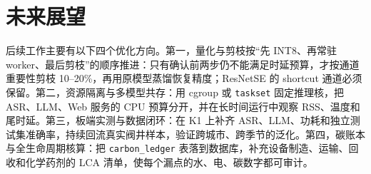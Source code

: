 \documentclass[UTF8,11pt,a4paper,fontset=none]{ctexart}
\begin{document}
\section{未来展望}
\label{sec:future}

后续工作主要有以下四个优化方向。第一，量化与剪枝按“先 INT8、再常驻 worker、最后剪枝”的顺序推进：只有确认前两步仍不能满足时延预算，才按通道重要性剪枝 10--20\%，再用原模型蒸馏恢复精度；ResNetSE 的 shortcut 通道必须保留。第二，资源隔离与多模型共存：用 cgroup 或 \texttt{taskset} 固定推理核，把 ASR、LLM、Web 服务的 CPU 预算分开，并在长时间运行中观察 RSS、温度和尾时延。第三，板端实测与数据闭环：在 K1 上补齐 ASR、LLM、功耗和独立测试集准确率，持续回流真实阀井样本，验证跨城市、跨季节的泛化。第四，碳账本与全生命周期核算：把 \texttt{carbon\_ledger} 表落到数据库，补充设备制造、运输、回收和化学药剂的 LCA 清单，使每个漏点的水、电、碳数字都可审计。
\end{document}
